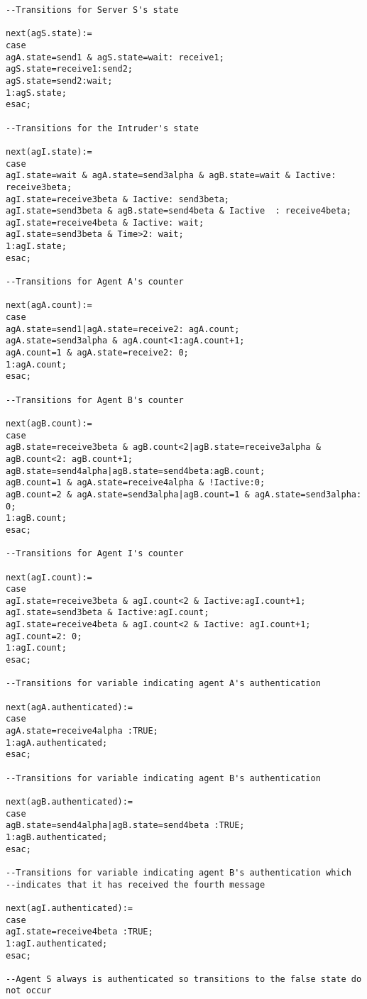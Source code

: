\begin{appendix}
{\begin{verbatim}
--Transitions for Server S's state

next(agS.state):=
case
agA.state=send1 & agS.state=wait: receive1;
agS.state=receive1:send2;
agS.state=send2:wait;
1:agS.state;
esac;

--Transitions for the Intruder's state

next(agI.state):=
case
agI.state=wait & agA.state=send3alpha & agB.state=wait & Iactive: receive3beta;
agI.state=receive3beta & Iactive: send3beta;
agI.state=send3beta & agB.state=send4beta & Iactive  : receive4beta;
agI.state=receive4beta & Iactive: wait;
agI.state=send3beta & Time>2: wait;
1:agI.state;
esac;

--Transitions for Agent A's counter

next(agA.count):=
case
agA.state=send1|agA.state=receive2: agA.count;
agA.state=send3alpha & agA.count<1:agA.count+1;
agA.count=1 & agA.state=receive2: 0;
1:agA.count;
esac;

--Transitions for Agent B's counter

next(agB.count):=
case
agB.state=receive3beta & agB.count<2|agB.state=receive3alpha & agB.count<2: agB.count+1;
agB.state=send4alpha|agB.state=send4beta:agB.count;
agB.count=1 & agA.state=receive4alpha & !Iactive:0;
agB.count=2 & agA.state=send3alpha|agB.count=1 & agA.state=send3alpha: 0;
1:agB.count;
esac;

--Transitions for Agent I's counter

next(agI.count):=
case
agI.state=receive3beta & agI.count<2 & Iactive:agI.count+1;
agI.state=send3beta & Iactive:agI.count;
agI.state=receive4beta & agI.count<2 & Iactive: agI.count+1;
agI.count=2: 0;
1:agI.count;
esac;

--Transitions for variable indicating agent A's authentication

next(agA.authenticated):=
case
agA.state=receive4alpha :TRUE;
1:agA.authenticated;
esac;

--Transitions for variable indicating agent B's authentication

next(agB.authenticated):=
case
agB.state=send4alpha|agB.state=send4beta :TRUE;
1:agB.authenticated;
esac;

--Transitions for variable indicating agent B's authentication which 
--indicates that it has received the fourth message

next(agI.authenticated):=
case
agI.state=receive4beta :TRUE;
1:agI.authenticated;
esac;

--Agent S always is authenticated so transitions to the false state do not occur


\end{verbatim}}
\end{appendix}
